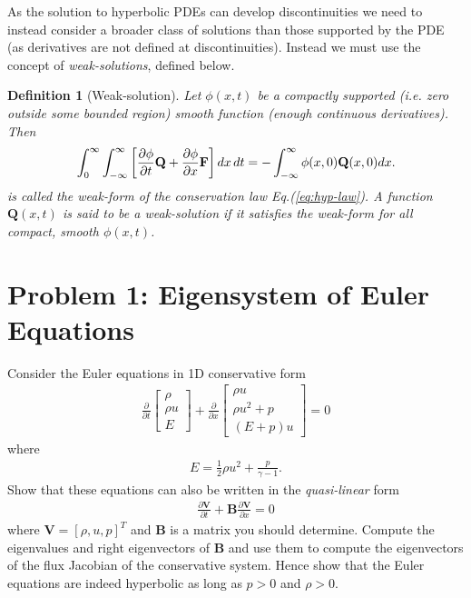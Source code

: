 \documentclass[11pt]{article}
\newtheorem{definition}{Definition}
\newcommand{\eqr}[1]{Eq.\thinspace(#1)}
\newcommand{\pfrac}[2]{\frac{\partial #1}{\partial #2}}
\newcommand{\mvec}[1]{\mathbf{#1}}
\begin{document}
As the solution to hyperbolic PDEs can develop discontinuities we need
to instead consider a broader class of solutions than those supported
by the PDE (as derivatives are not defined at
discontinuities). Instead we must use the concept of
\emph{weak-solutions}, defined below.

\begin{definition}[Weak-solution]
  Let $\phi(x,t)$ be a compactly supported (i.e. zero outside some
  bounded region) smooth function (enough continuous
  derivatives). Then
  \begin{align}
    \int_0^\infty  \int_{-\infty}^\infty 
    \bigg[\pfrac{\phi}{t} \mvec{Q} + \pfrac{\phi}{x} \mvec{F}\bigg]\thinspace
    dx\thinspace dt
    =
    -
    \int_{-\infty}^\infty \phi(x,0) \mvec{Q}(x,0) dx.
    \label{eq:weak-sol}
  \end{align}
  is called the \emph{weak-form} of the conservation law
  \eqr{\ref{eq:hyp-law}}. A function $\mvec{Q}(x,t)$ is said to be a
  weak-solution if it satisfies the weak-form for all compact, smooth
  $\phi(x,t)$.
\end{definition}

\section*{Problem 1: Eigensystem of Euler Equations}

Consider the Euler equations in 1D conservative form
\begin{align*}
  \frac{\partial}{\partial{t}}
  \left[
    \begin{matrix}
      \rho \\
      \rho u \\
      E
    \end{matrix}
  \right]
  +
  \frac{\partial}{\partial{x}}
  \left[
    \begin{matrix}
      \rho u \\
      \rho u^2 + p \\
      (E+p)u
    \end{matrix}
  \right]
  =
  0
\end{align*}
where
\begin{align*}
  E = \frac{1}{2}\rho u^2 + \frac{p}{\gamma-1}.
\end{align*}
Show that these equations can also be written in the
\emph{quasi-linear} form
\begin{align*}
  \pfrac{\mvec{V}}{t} + \mvec{B}\pfrac{\mvec{V}}{x} = 0
\end{align*}
where $\mvec{V} = [\rho, u, p]^T$ and $\mvec{B}$ is a matrix you
should determine. Compute the eigenvalues and right eigenvectors of
$\mvec{B}$ and use them to compute the eigenvectors of the flux
Jacobian of the conservative system. Hence show that the Euler
equations are indeed hyperbolic as long as $p>0$ and $\rho > 0$.
\end{document}
